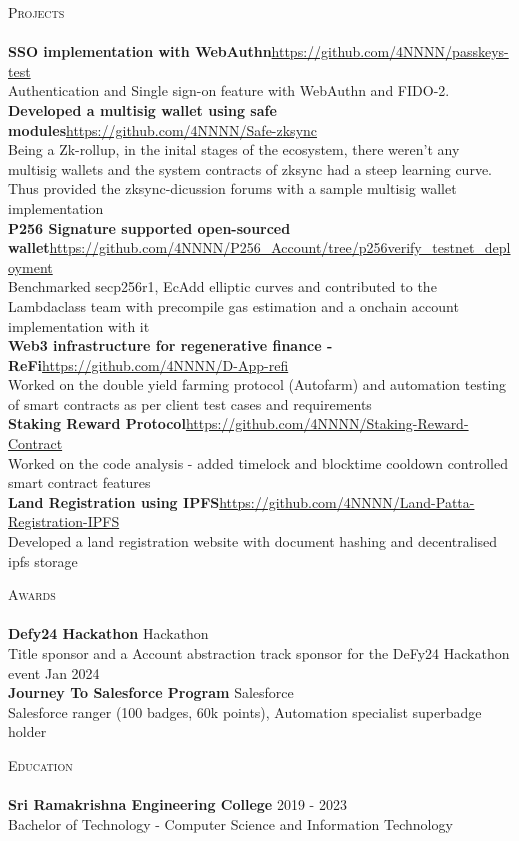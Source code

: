 \documentclass[a4paper]{article}
\newcommand{\lineunder} {
    \vspace*{-8pt} \\
    \hspace*{-18pt} \hrulefill \\
}
\newcommand{\header} [1] {
    {\hspace*{-18pt}\vspace*{6pt} \textsc{#1}}
    \vspace*{-6pt} \lineunder
}
\begin{document}
\header{Projects}
{\textbf{SSO implementation with WebAuthn}}\hfill \url{https://github.com/4NNNN/passkeys-test}\\
Authentication and Single sign-on feature with WebAuthn and FIDO-2.\\
\vspace*{2mm}
{\textbf{Developed a multisig wallet using safe modules}}\hfill \url{https://github.com/4NNNN/Safe-zksync}\\
Being a Zk-rollup, in the inital stages of the ecosystem, there weren't any multisig wallets and the system contracts of zksync had a steep learning curve. Thus provided the zksync-dicussion forums with a sample multisig wallet implementation\\
\vspace*{2mm}
{\textbf{P256 Signature supported open-sourced wallet}}\hfill \url{https://github.com/4NNNN/P256_Account/tree/p256verify_testnet_deployment}\\
Benchmarked secp256r1, EcAdd elliptic curves and contributed to the Lambdaclass team with precompile gas estimation and a onchain account implementation with it\\
\vspace*{2mm}
{\textbf{Web3 infrastructure for regenerative finance - ReFi}}\hfill \url{https://github.com/4NNNN/D-App-refi}\\
Worked on the double yield farming protocol (Autofarm) and automation testing of smart contracts as per client test cases and requirements\\
\vspace*{2mm}
{\textbf{Staking Reward Protocol}}\hfill \url{https://github.com/4NNNN/Staking-Reward-Contract}\\
Worked on the code analysis - added timelock and blocktime cooldown controlled smart contract features\\
\vspace*{2mm}
{\textbf{Land Registration using IPFS}}\hfill \url{https://github.com/4NNNN/Land-Patta-Registration-IPFS}\\
Developed a land registration website with document hashing and decentralised ipfs storage\\
\vspace*{2mm}

\header{Awards}
\textbf{Defy24 Hackathon} \hfill Hackathon\\
Title sponsor and a Account abstraction track sponsor for the DeFy24 Hackathon event \hfill Jan 2024\\
\vspace*{2mm}
\textbf{Journey To Salesforce Program} \hfill Salesforce\\
Salesforce ranger (100 badges, 60k points), Automation specialist superbadge holder
\vspace*{2mm}

\header{Education}
\textbf{Sri Ramakrishna Engineering College} \hfill 2019 - 2023\\
Bachelor of Technology - Computer Science and Information Technology \\
\vspace*{2mm}

\
\end{document}
